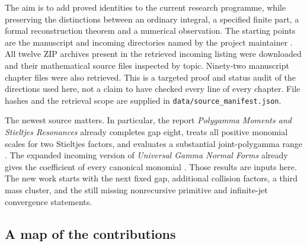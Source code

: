 \documentclass[11pt,a4paper]{article}
\theoremstyle{definition}
\theoremstyle{remark}
\numberwithin{equation}{section}
\newcommand{\file}[1]{\nolinkurl{#1}}
\begin{document}
The aim is to add proved identities to the current research programme,
while preserving the distinctions between an ordinary integral, a specified
finite part, a formal reconstruction theorem and a numerical observation.
The starting points are the manuscript and incoming directories named by
the project maintainer \cite{RepoManuscript,RepoIncoming}. All twelve ZIP
archives present in the retrieved incoming listing were downloaded and
their mathematical source files inspected by topic. Ninety-two manuscript
chapter files were also retrieved. This is a targeted proof and status
audit of the directions used here, not a claim to have checked every line
of every chapter. File hashes and the retrieval scope are supplied in
\file{data/source_manifest.json}.

The newest source matters. In particular, the report
\emph{Polygamma Moments and Stieltjes Resonances} already completes gap
eight, treats all positive monomial scales for two Stieltjes factors,
and evaluates a substantial joint-polygamma range
\cite{PolygammaResonances}. The expanded incoming version of
\emph{Universal Gamma Normal Forms} already gives the coefficient of
every canonical monomial \cite{UniversalIncoming}. Those results are
inputs here. The new work starts with the next fixed gap, additional
collision factors, a third mass cluster, and the still missing
nonrecursive primitive and infinite-jet convergence statements.

\subsection{A map of the contributions}
\end{document}
